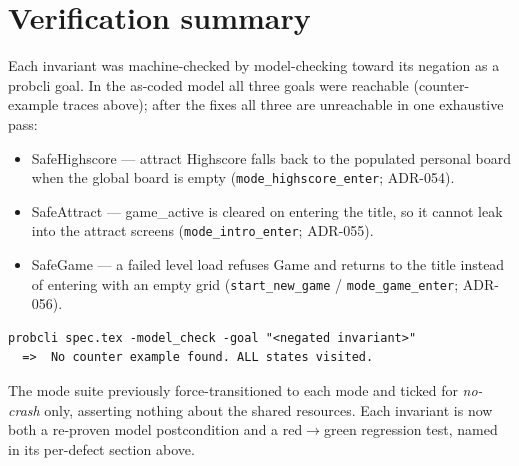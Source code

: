 \documentclass[a4paper,10pt,fleqn]{article}
\begin{document}
\section{Verification summary}

Each invariant was machine-checked by model-checking toward its negation
as a probcli goal.  In the as-coded model all three goals were reachable
(counter-example traces above); after the fixes all three are unreachable
in one exhaustive pass:

\begin{itemize}
  \item \textsf{SafeHighscore} --- attract \textsf{Highscore} falls back to
    the populated personal board when the global board is empty
    (\texttt{mode\_highscore\_enter}; ADR-054).
  \item \textsf{SafeAttract} --- \textsf{game\_active} is cleared on
    entering the title, so it cannot leak into the attract screens
    (\texttt{mode\_intro\_enter}; ADR-055).
  \item \textsf{SafeGame} --- a failed level load refuses \textsf{Game} and
    returns to the title instead of entering with an empty grid
    (\texttt{start\_new\_game} / \texttt{mode\_game\_enter}; ADR-056).
\end{itemize}

\begin{verbatim}
probcli spec.tex -model_check -goal "<negated invariant>"
  =>  No counter example found. ALL states visited.
\end{verbatim}

The mode suite previously force-transitioned to each mode and ticked for
\emph{no-crash} only, asserting nothing about the shared resources.  Each
invariant is now both a re-proven model postcondition and a red$\to$green
regression test, named in its per-defect section above.
\end{document}
